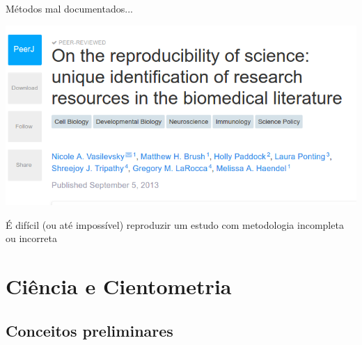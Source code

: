 \documentclass{beamer}
\begin{document}


\begin{frame}{Métodos mal documentados...}
  \begin{center}
    \includegraphics[width=\textwidth]{Intro/Vasilevsky}

  \end{center}
\end{frame}

\begin{frame}{}
  \begin{center}
    É difícil (ou até impossível) reproduzir um estudo com metodologia incompleta ou incorreta
  \end{center}
\end{frame}

\section{Ciência e Cientometria}

\subsection{Conceitos preliminares}
\end{document}
